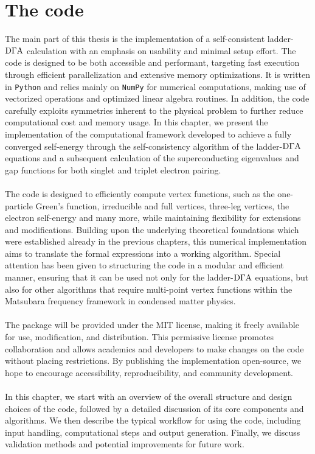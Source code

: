 \documentclass[\main/main.tex]{subfiles}
\begin{document}
\sloppy

\chapter{The code}

The main part of this thesis is the implementation of a self-consistent ladder-$\text{D}\Gamma\text{A}$ calculation with an emphasis on usability and minimal setup effort. The code is designed to be both accessible and performant, targeting fast execution through efficient parallelization and extensive memory optimizations. It is written in \texttt{Python} and relies mainly on \texttt{NumPy} for numerical computations, making use of vectorized operations and optimized linear algebra routines. In addition, the code carefully exploits symmetries inherent to the physical problem to further reduce computational cost and memory usage. In this chapter, we present the implementation of the computational framework developed to achieve a fully converged self-energy through the self-consistency algorithm of the ladder-$\text{D}\Gamma\text{A}$ equations and a subsequent calculation of the superconducting eigenvalues and gap functions for both singlet and triplet electron pairing. 
\\\\
The code is designed to efficiently compute vertex functions, such as the one-particle Green's function, irreducible and full vertices, three-leg vertices, the electron self-energy and many more, while maintaining flexibility for extensions and modifications. Building upon the underlying theoretical foundations which were established already in the previous chapters, this numerical implementation aims to translate the formal expressions into a working algorithm. Special attention has been given to structuring the code in a modular and efficient manner, ensuring that it can be used not only for the ladder-$\text{D}\Gamma\text{A}$ equations, but also for other algorithms that require multi-point vertex functions within the Matsubara frequency framework in condensed matter physics.
\\\\
The package will be provided under the MIT license, making it freely available for use, modification, and distribution. This permissive license promotes collaboration and allows academics and developers to make changes on the code without placing restrictions. By publishing the implementation open-source, we hope to encourage accessibility, reproducibility, and community development.
\\\\
In this chapter, we start with an overview of the overall structure and design choices of the code, followed by a detailed discussion of its core components and algorithms. We then describe the typical workflow for using the code, including input handling, computational steps and output generation. Finally, we discuss validation methods and potential improvements for future work.
\end{document}
